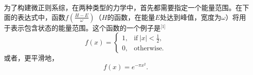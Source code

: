 为了构建微正则系综，在两种类型的力学中，首先都需要指定一个能量范围。在下面的表达式中，函数\( f \left( \frac{H - E}{\omega} \right) \)（\(H\)的函数，在能量\( E \)处达到峰值，宽度为\( \omega \)）将用于表示包含状态的能量范围。这个函数的一个例子是\(^\text{[1]}\)
\[
f(x) = 
\begin{cases} 
1, & \text{if} \ |x| < \frac{1}{2}, \\
0, & \text{otherwise.} 
\end{cases}~
\]
或者，更平滑地，
\[
f(x) = e^{-\pi x^2}.~
\]
